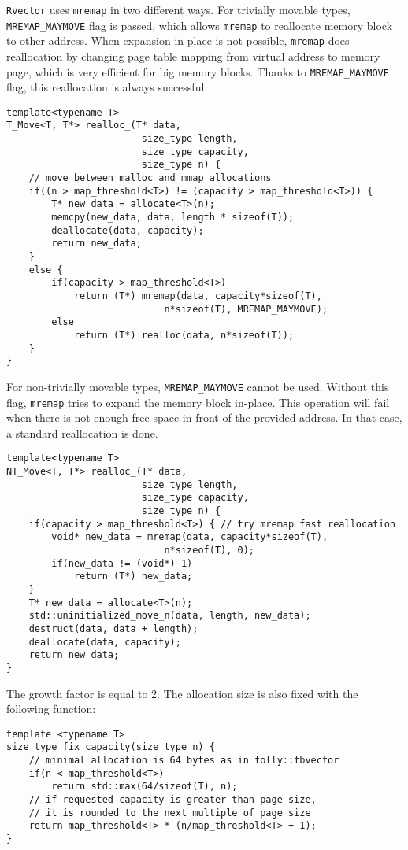 \documentclass[inz, english, shortabstract]{iithesis}
\begin{document}
{\tt Rvector} uses {\tt mremap} in two different ways. For trivially movable types, {\tt MREMAP\_MAYMOVE} flag is passed, which allows {\tt mremap} to reallocate memory block to other address. When expansion in-place is not possible, {\tt mremap} does reallocation by changing page table mapping from virtual address to memory page\cite{mremap}, which is very efficient for big memory blocks. Thanks to {\tt MREMAP\_MAYMOVE} flag, this reallocation is always successful. 
\begin{lstlisting}[caption=rvector trivial type reallocation.]
template<typename T>
T_Move<T, T*> realloc_(T* data, 
						size_type length, 
						size_type capacity, 
						size_type n) {
	// move between malloc and mmap allocations
	if((n > map_threshold<T>) != (capacity > map_threshold<T>)) {
        T* new_data = allocate<T>(n);
        memcpy(new_data, data, length * sizeof(T));
        deallocate(data, capacity);
        return new_data;
    }
    else {
        if(capacity > map_threshold<T>)
        	return (T*) mremap(data, capacity*sizeof(T), 
                    		n*sizeof(T), MREMAP_MAYMOVE);
        else
        	return (T*) realloc(data, n*sizeof(T));
    }
}
\end{lstlisting}

For non-trivially movable types, {\tt MREMAP\_MAYMOVE} cannot be used. Without this flag, {\tt mremap} tries to expand the memory block in-place. This operation will fail when there is not enough free space in front of the provided address. In that case, a standard reallocation is done.
\begin{lstlisting}[caption=rvector non-trivial type reallocation.]
template<typename T>
NT_Move<T, T*> realloc_(T* data, 
						size_type length, 
						size_type capacity, 
						size_type n) {
    if(capacity > map_threshold<T>) { // try mremap fast reallocation
        void* new_data = mremap(data, capacity*sizeof(T), 
                    		n*sizeof(T), 0);
        if(new_data != (void*)-1)
        	return (T*) new_data;
    }
    T* new_data = allocate<T>(n);
    std::uninitialized_move_n(data, length, new_data);
    destruct(data, data + length);
    deallocate(data, capacity);
    return new_data;
}
\end{lstlisting}

The growth factor is equal to 2. The allocation size is also fixed with the following function: 
\begin{lstlisting}[caption=fix capacity.]
template <typename T>
size_type fix_capacity(size_type n) {
	// minimal allocation is 64 bytes as in folly::fbvector
	if(n < map_threshold<T>)
        return std::max(64/sizeof(T), n);
    // if requested capacity is greater than page size,
    // it is rounded to the next multiple of page size
    return map_threshold<T> * (n/map_threshold<T> + 1);
}
\end{lstlisting}
\end{document}
